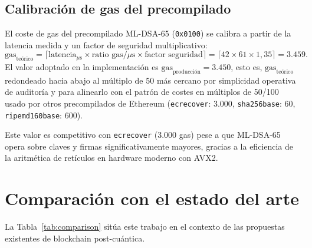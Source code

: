 \subsection{Calibración de gas del precompilado}

El coste de gas del precompilado ML-DSA-65 (\texttt{0x0100}) se calibra a partir de la latencia medida y un factor de seguridad multiplicativo:
\begin{equation}
  \text{gas}_{\text{teórico}} = \lceil \text{latencia}_{\mu\text{s}} \times \text{ratio gas/}\mu\text{s} \times \text{factor seguridad} \rceil = \lceil 42 \times 61 \times 1{,}35 \rceil = 3.459.
\end{equation}
El valor adoptado en la implementación es $\text{gas}_{\text{producción}} = 3.450$, esto es, $\text{gas}_{\text{teórico}}$ redondeado hacia abajo al múltiplo de 50 más cercano por simplicidad operativa de auditoría y para alinearlo con el patrón de costes en múltiplos de 50/100 usado por otros precompilados de Ethereum (\texttt{ecrecover}: 3.000, \texttt{sha256base}: 60, \texttt{ripemd160base}: 600).

Este valor es competitivo con \texttt{ecrecover} (3.000 gas) pese a que ML-DSA-65 opera sobre claves y firmas significativamente mayores, gracias a la eficiencia de la aritmética de retículos en hardware moderno con AVX2.


\section{Comparación con el estado del arte}
\label{sec:res_comparison}

La Tabla~\ref{tab:comparison} sitúa este trabajo en el contexto de las propuestas existentes de blockchain post-cuántica.

